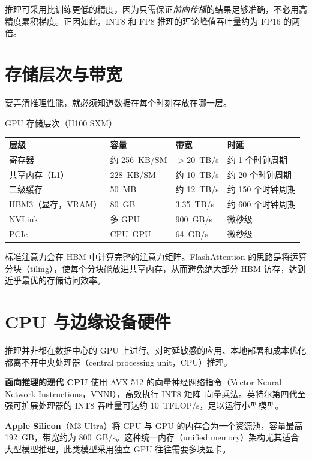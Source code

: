 推理可采用比训练更低的精度，因为只需保证\emph{前向传播}的结果足够准确，不必用高精度累积梯度。正因如此，INT8 和 FP8 推理的理论峰值吞吐量约为 FP16 的两倍。

\section{存储层次与带宽}

要弄清推理性能，就必须知道数据在每个时刻存放在哪一层。

\begin{conceptbox}{GPU 存储层次（H100 SXM）}
\begin{tabular}{@{}llll@{}}
\textbf{层级} & \textbf{容量} & \textbf{带宽} & \textbf{时延} \\
寄存器 & 约 256~KB/SM & $>20$~TB/s & 约 1 个时钟周期 \\
共享内存（L1） & 228~KB/SM & 约 10~TB/s & 约 20 个时钟周期 \\
二级缓存 & 50~MB & 约 12~TB/s & 约 150 个时钟周期 \\
HBM3（显存，VRAM） & 80~GB & 3.35~TB/s & 约 600 个时钟周期 \\
NVLink & 多 GPU & 900~GB/s & 微秒级 \\
PCIe & CPU--GPU & 64~GB/s & 微秒级 \\
\end{tabular}
\end{conceptbox}

标准注意力会在 HBM 中计算完整的注意力矩阵。FlashAttention 的思路是将运算分块（tiling），使每个分块能放进共享内存，从而避免绝大部分 HBM 访存，达到近乎最优的存储访问效率。

\section{CPU 与边缘设备硬件}

推理并非都在数据中心的 GPU 上进行。对时延敏感的应用、本地部署和成本优化都离不开中央处理器（central processing unit，CPU）推理。

\textbf{面向推理的现代 CPU} 使用 AVX-512 的向量神经网络指令（Vector Neural Network Instructions，VNNI），高效执行 INT8 矩阵–向量乘法。英特尔第四代至强可扩展处理器的 INT8 吞吐量可达约 10~TFLOP/s，足以运行小型模型。

\textbf{Apple Silicon}（M3 Ultra）将 CPU 与 GPU 的内存合为一个资源池，容量最高 192~GB，带宽约为 800~GB/s。这种统一内存（unified memory）架构尤其适合大型模型推理，此类模型采用独立 GPU 往往需要多块显卡。


